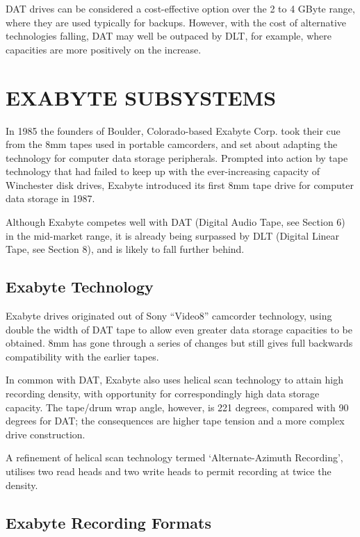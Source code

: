 DAT drives can be considered a cost-effective option over the 2 to 4 GByte
range, where they are used typically for backups. However, with the cost of
alternative technologies falling, DAT may well be outpaced by DLT, for
example, where capacities are more positively on the increase.

\section {EXABYTE SUBSYSTEMS}

In 1985 the founders of Boulder, Colorado-based Exabyte Corp. took their cue
from the 8mm tapes used in portable camcorders, and set about adapting the
technology for computer data storage peripherals. Prompted into action by
tape technology that had failed to keep up with the ever-increasing capacity
of Winchester disk drives, Exabyte introduced its first 8mm tape drive for
computer data storage in 1987.

Although Exabyte competes well with DAT (Digital Audio Tape, see Section 6)
in the mid-market range, it is already being surpassed by DLT (Digital Linear
Tape, see Section 8), and is likely to fall further behind.

\subsection {Exabyte Technology}

Exabyte drives originated out of Sony ``Video8'' camcorder technology, using
double the width of DAT tape to allow even greater data storage capacities
to be obtained. 8mm has gone through a series of changes but still gives
full backwards compatibility with the earlier tapes.

In common with DAT, Exabyte also uses helical scan technology to attain high
recording density, with opportunity for correspondingly high data storage
capacity. The tape/drum wrap angle, however, is 221 degrees, compared with
90 degrees for DAT; the consequences are higher tape tension and a more
complex drive construction.

A refinement of helical scan technology termed `Alternate-Azimuth Recording',
utilises two read heads and two write heads to permit recording at twice the
density.

\subsection {Exabyte Recording Formats}

